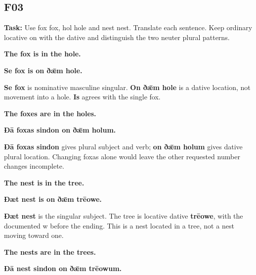 \subsection*{F03}

\textbf{Task:} Use fox fox, hol hole and nest nest. Translate each sentence. Keep ordinary locative on with the dative and distinguish the two neuter plural patterns.

\textbf{The fox is in the hole.}

\textbf{Se fox is on ðǣm hole.}

\textbf{Se fox} is nominative masculine singular. \textbf{On ðǣm hole} is a dative location, not movement into a hole. \textbf{Is} agrees with the single fox.

\textbf{The foxes are in the holes.}

\textbf{Ðā foxas sindon on ðǣm holum.}

\textbf{Ðā foxas sindon} gives plural subject and verb; \textbf{on ðǣm holum} gives dative plural location. Changing foxas alone would leave the other requested number changes incomplete.

\textbf{The nest is in the tree.}

\textbf{Ðæt nest is on ðǣm trēowe.}

\textbf{Ðæt nest} is the singular subject. The tree is locative dative \textbf{trēowe}, with the documented w before the ending. This is a nest located in a tree, not a nest moving toward one.

\textbf{The nests are in the trees.}

\textbf{Ðā nest sindon on ðǣm trēowum.}

